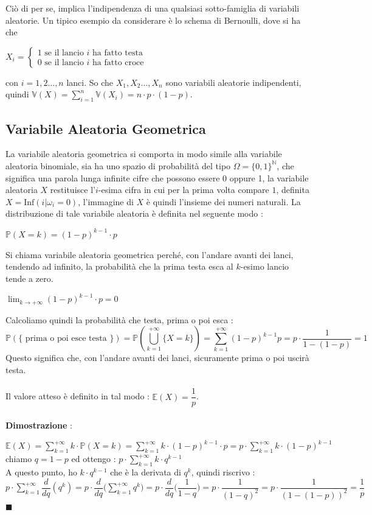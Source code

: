 \documentclass[12pt, letterpaper]{article}
\newcommand{\N}{{\mathbb N}}
\newcommand{\E}{{\mathbb E}}
\newcommand{\V}{{\mathbb V}}
\newcommand{\acc}{\\\hphantom{}\\}
\newcommand{\Prob}{{\mathbb P}}
\begin{document}
Ciò di per se, implica l'indipendenza di una qualsiasi sotto-famiglia di variabili aleatorie. Un tipico esempio 
da considerare è lo schema di Bernoulli, dove si ha che \begin{center}\(X_i=\begin{cases}
    1 \text{ se il lancio }i\text{ ha fatto testa}\\ 0 \text{ se il lancio }i\text{ ha fatto croce}
\end{cases}\)\end{center}
con \(i=1,2\dots,n\) lanci. So che \(X_1,X_2\dots,X_n\) sono variabili aleatorie indipendenti, quindi 
\(\V(X)=\displaystyle\sum _{i=1}^n\V(X_i)=n\cdot p\cdot (1-p)\).
\subsection{Variabile Aleatoria Geometrica}
La variabile aleatoria geometrica si comporta in modo simile alla variabile aleatoria binomiale, sia ha uno 
spazio di probabilità del tipo \(\Omega=\{0,1\}^{\N}\), che significa una parola lunga infinite cifre che possono 
essere 0 oppure 1, la variabile aleatoria \(X\) restituisce l'\(i\)-esima cifra in cui per la prima 
volta compare \(1\), definita \(X=\text{Inf}(i|\omega_i=0)\), l'immagine di \(X\) è quindi l'insieme dei 
numeri naturali. La distribuzione di tale variabile aleatoria è definita nel seguente modo : \begin{center}
    \(\Prob(X=k)=(1-p)^{k-1}\cdot p\)
\end{center}
Si chiama variabile aleatoria geometrica perché, con l'andare avanti dei lanci, tendendo ad infinito, la 
probabilità che la prima testa esca al \(k\)-esimo lancio tende a zero. \begin{center}
    \(\displaystyle\lim_{k\rightarrow+\infty}(1-p)^{k-1}\cdot p=0\)\end{center}
    Calcoliamo quindi la probabilità che testa, prima o poi esca : \begin{equation}
        \Prob(\{\text{ prima o poi esce testa }\})=\Prob(\bigcup^{+\infty}_{k=1}\{X=k\})=\sum^{+\infty}_{k=1}
        (1-p)^{k-1}p=p\cdot\dfrac{1}{1-(1-p)}=1
    \end{equation}
    Questo significa che, con l'andare avanti dei lanci, sicuramente prima o poi 
    uscirà testa.\acc 
    Il valore atteso è definito in tal modo : \(\E(X)=\dfrac{1}{p}\).\acc
    \textbf{Dimostrazione }:
    \begin{center}
        \(
        \E(X)=\displaystyle\sum_{k=1}^{+\infty}k\cdot\Prob(X=k) =\sum_{k=1}^{+\infty} k\cdot (1-p)^{k-1}\cdot p  
        =p\cdot \sum_{k=1}^{+\infty} k\cdot (1-p)^{k-1}
        \)\\ chiamo \(q=1-p\) ed ottengo : \(\displaystyle p\cdot \sum_{k=1}^{+\infty} k\cdot q^{k-1}\)\\
        A questo punto, ho \(k\cdot q^{k-1}\) che è la derivata di \(q^k\), quindi riscrivo : \\\(
            \displaystyle p\cdot \sum_{k=1}^{+\infty} \dfrac{d}{dq}(q^k)=p\cdot \dfrac{d}{dq}\Big(\sum_{k=1}^{+\infty}q^k\Big)
        =p\cdot \dfrac{d}{dq}\Big( \dfrac{1}{1-q}  \Big)=p\cdot\dfrac{1}{(1-q)^2}=p\cdot\dfrac{1}{(1-(1-p))^2}=\dfrac{1}{p}\)
     \(\blacksquare\)\end{center}
\end{document}

